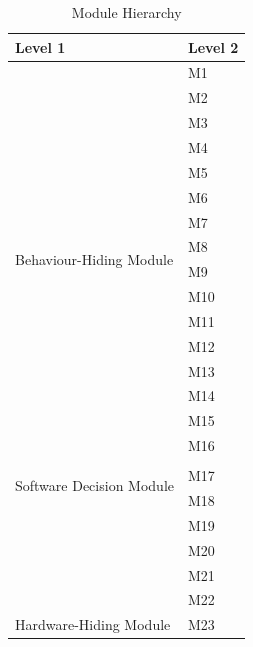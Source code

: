\documentclass[12pt, titlepage]{article}
\begin{document}
\begin{table}[H]
\centering
\begin{tabular}{p{} p{}}
\toprule
\textbf{Level 1} & \textbf{Level 2}\\
\midrule

\multirow{16}{0.3\textwidth}{Behaviour-Hiding Module} 
& M1\\
& M2\\
& M3\\
& M4\\
& M5\\
& M6\\
& M7\\ 
& M8\\
& M9\\
& M10\\
& M11\\ 
& M12\\
& M13\\
& M14\\
& M15\\
& M16\\
\midrule

\multirow{3}{0.3\textwidth}{Software Decision Module} \\
& M17\\
& M18\\
& M19\\
& M20\\
& M21\\
& M22\\

\midrule

{Hardware-Hiding Module} & M23 \\

\bottomrule

\end{tabular}
\caption{Module Hierarchy}
\label{TblMH}
\end{table}

\end{document}
